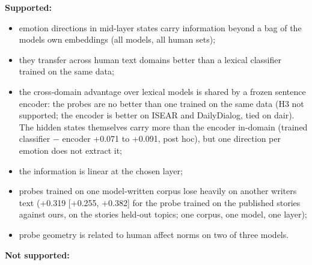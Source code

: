 \documentclass[
  10pt,
]{article}
\providecommand{\tightlist}{%
  \setlength{\itemsep}{0pt}\setlength{\parskip}{0pt}}
\begin{document}
\textbf{Supported:}

\begin{itemize}
\tightlist
\item
  emotion directions in mid-layer states carry information beyond a bag
  of the model\textquotesingle s own embeddings (all models, all human
  sets);
\item
  they transfer across human text domains better than a lexical
  classifier trained on the same data;
\item
  the cross-domain advantage over lexical models is shared by a frozen
  sentence encoder: the probes are no better than one trained on the
  same data (H3 not supported; the encoder is better on ISEAR and
  DailyDialog, tied on dair). The hidden states themselves carry more
  than the encoder in-domain (trained classifier − encoder +0.071 to
  +0.091, post hoc), but one direction per emotion does not extract it;
\item
  the information is linear at the chosen layer;
\item
  probes trained on one model-written corpus lose heavily on another
  writer\textquotesingle s text (+0.319 {[}+0.255, +0.382{]} for the
  probe trained on the published stories against ours, on the
  stories\textquotesingle{} held-out topics; one corpus, one model, one
  layer);
\item
  probe geometry is related to human affect norms on two of three
  models.
\end{itemize}

\textbf{Not supported:}
\end{document}

